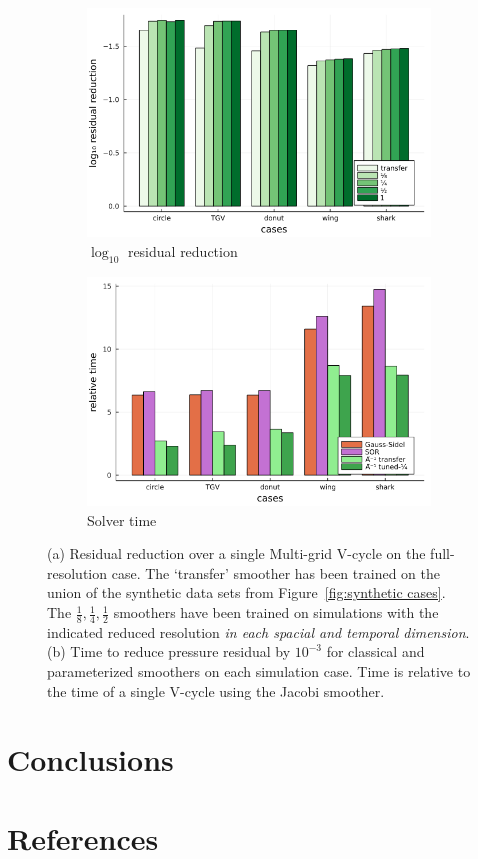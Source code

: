 \documentclass[review]{elsarticle}
\begin{document}
\begin{figure}
    \centering
    \begin{subfigure}[b]{0.48\textwidth}
        \centering
        \includegraphics[width=\textwidth]{figures/scaleloss.png}
        \caption{$\log_{10}$ residual reduction}
        \label{fig:scaled loss}
    \end{subfigure}
    \hfill
    \begin{subfigure}[b]{0.48\textwidth}
        \centering
        \includegraphics[width=\textwidth]{figures/crosscount.png}
        \caption{Solver time}
        \label{fig:simulation time}
    \end{subfigure}
        \caption{(a) Residual reduction over a single Multi-grid V-cycle on the full-resolution case. The `transfer' smoother has been trained on the union of the synthetic data sets from Figure~\ref{fig:synthetic cases}. The $\frac 18, \frac 14, \frac 12$ smoothers have been trained on simulations with the indicated reduced resolution \textit{in each spacial and temporal dimension}. (b) Time to reduce pressure residual by $10^{-3}$ for classical and parameterized smoothers on each simulation case. Time is relative to the time of a single V-cycle using the Jacobi smoother.}
        \label{fig:tuned simulation}
\end{figure}


\section{Conclusions}

\section*{References}


\end{document}
